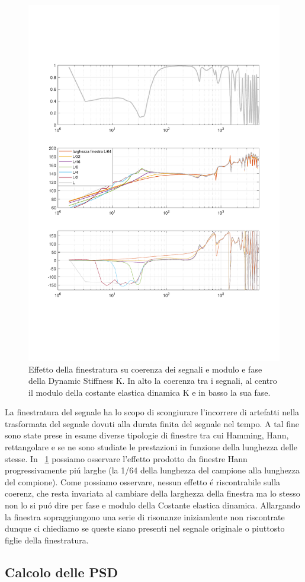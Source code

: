 \documentclass[12pt,a4paper]{article}
\begin{document}
\begin{figure}
	\centering
	\includegraphics[width=16cm]{effettofinestra}
	\caption{Effetto della finestratura su coerenza dei segnali e modulo e fase della Dynamic Stiffness K. In alto la coerenza tra i segnali, al centro il modulo della costante elastica dinamica K e in basso la sua fase.}
	\label{fig:effettofinestra}
\end{figure}

La finestratura del segnale ha lo scopo di scongiurare l'incorrere di artefatti nella trasformata del segnale dovuti alla durata finita del segnale nel tempo. A tal fine sono state prese in esame diverse tipologie di finestre tra cui Hamming, Hann, rettangolare e se ne sono studiate le prestazioni in funzione della lunghezza delle stesse. In \figurename~\ref{fig:effettofinestra} possiamo osservare l'effetto prodotto da finestre Hann progressivamente pi\'u larghe (la 1/64 della lunghezza del campione alla lunghezza del compione). Come possiamo osservare, nessun effetto \'e riscontrabile sulla coerenz, che resta invariata al cambiare della larghezza della finestra ma lo stesso non lo si pu\'o dire per fase e modulo della Costante elastica dinamica. Allargando la finestra sopraggiungono una serie di risonanze iniziamlente non riscontrate dunque ci chiediamo se queste siano presenti nel segnale originale o piuttosto figlie della finestratura.
\subsection{Calcolo delle PSD}












 
 
\end{document}
